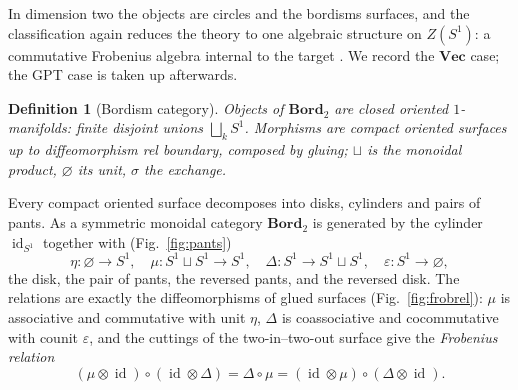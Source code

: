 \documentclass[prl,aps,10pt,superscriptaddress, floatfix]{revtex4-2}
\newtheorem*{defi}{Definition}
\begin{document}
In dimension two the objects are circles and the bordisms surfaces, and the classification again reduces the theory to one algebraic structure on $Z(S^1)$: a commutative Frobenius algebra internal to the target \cite{Dijkgraaf1989,Abrams1996,Kock2004}. We record the $\mathbf{Vec}$ case; the GPT case is taken up afterwards.

\begin{defi}[Bordism category]
Objects of $\mathbf{Bord}_2$ are closed oriented $1$-manifolds: finite disjoint unions $\bigsqcup_k S^1$. Morphisms are compact oriented surfaces up to diffeomorphism rel boundary, composed by gluing; $\sqcup$ is the monoidal product, $\varnothing$ its unit, $\sigma$ the exchange.
\end{defi}

Every compact oriented surface decomposes into disks, cylinders and pairs of pants. As a symmetric monoidal category $\mathbf{Bord}_2$ is generated by the cylinder $\operatorname{id}_{S^1}$ together with (Fig.~\ref{fig:pants})
\[
\eta:\varnothing\to S^1,\quad
\mu:S^1\sqcup S^1\to S^1,\quad
\Delta:S^1\to S^1\sqcup S^1,\quad
\varepsilon:S^1\to\varnothing,
\]
the disk, the pair of pants, the reversed pants, and the reversed disk. The relations are exactly the diffeomorphisms of glued surfaces (Fig.~\ref{fig:frobrel}): $\mu$ is associative and commutative with unit $\eta$, $\Delta$ is coassociative and cocommutative with counit $\varepsilon$, and the cuttings of the two-in--two-out surface give the \emph{Frobenius relation}
\begin{equation}\label{eq:frobenius}
(\mu\otimes\operatorname{id})\circ(\operatorname{id}\otimes\Delta)
=\Delta\circ\mu
=(\operatorname{id}\otimes\mu)\circ(\Delta\otimes\operatorname{id}).
\end{equation}
\end{document}
